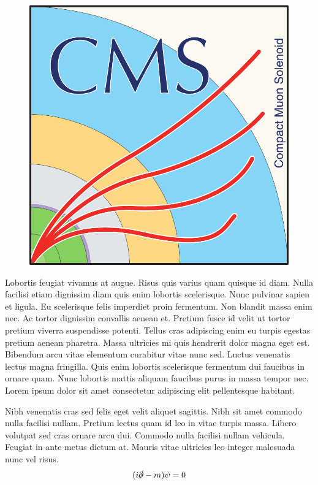\documentclass[landscape,a0paper,fontscale=0.42]{baposter} %
\begin{document}
\begin{poster}
{\begin{multicols}{2}
\begin{figure}
\hspace{0.4cm}\includegraphics[width=0.82\linewidth]{CMS_logo_May2014.pdf}
\end{figure}
Lobortis feugiat vivamus at augue. Risus quis varius quam quisque id diam. Nulla facilisi etiam dignissim diam quis enim lobortis scelerisque. Nunc pulvinar sapien et ligula. Eu scelerisque felis imperdiet proin fermentum. Non blandit massa enim nec. Ac tortor dignissim convallis aenean et. Pretium fusce id velit ut tortor pretium viverra suspendisse potenti. Tellus cras adipiscing enim eu turpis egestas pretium aenean pharetra. Massa ultricies mi quis hendrerit dolor magna eget est. Bibendum arcu vitae elementum curabitur vitae nunc sed. Luctus venenatis lectus magna fringilla. Quis enim lobortis scelerisque fermentum dui faucibus in ornare quam. Nunc lobortis mattis aliquam faucibus purus in massa tempor nec. Lorem ipsum dolor sit amet consectetur adipiscing elit pellentesque habitant.
\vspace{0.2cm}

Nibh venenatis cras sed felis eget velit aliquet sagittis. Nibh sit amet commodo nulla facilisi nullam. Pretium lectus quam id leo in vitae turpis massa. Libero volutpat sed cras ornare arcu dui. Commodo nulla facilisi nullam vehicula. Feugiat in ante metus dictum at. Mauris vitae ultricies leo integer malesuada nunc vel risus.
\vspace*{-0.1cm}
\begin{align}
(i\slashed{\partial} - m)\psi = 0
\end{align}


\end{multicols}}
\end{poster}
\end{document}
